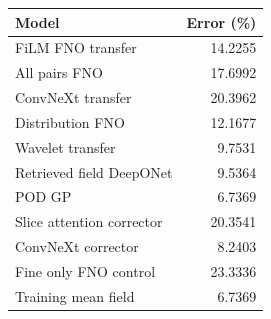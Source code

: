 \begin{tabular}{lr}
\toprule
Model & Error (\%) \\
\midrule
FiLM FNO transfer & 14.2255 \\
All pairs FNO & 17.6992 \\
ConvNeXt transfer & 20.3962 \\
Distribution FNO & 12.1677 \\
Wavelet transfer & 9.7531 \\
Retrieved field DeepONet & 9.5364 \\
POD GP & 6.7369 \\
Slice attention corrector & 20.3541 \\
ConvNeXt corrector & 8.2403 \\
Fine only FNO control & 23.3336 \\
Training mean field & 6.7369 \\
\bottomrule
\end{tabular}
